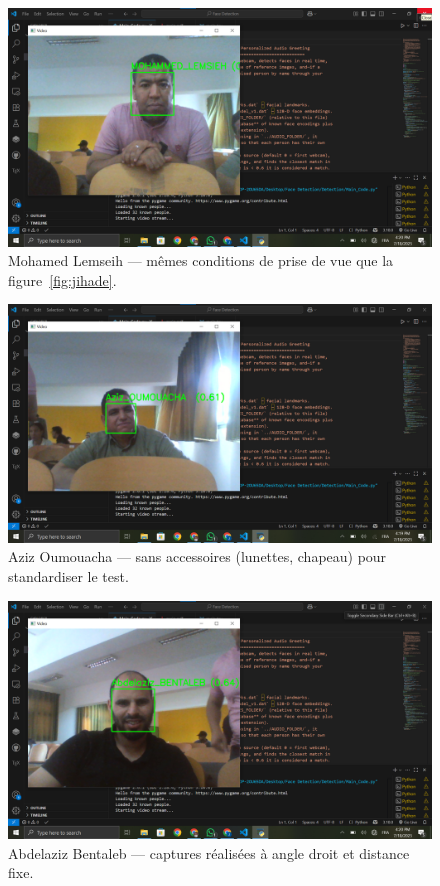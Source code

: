 \documentclass[12pt,a4paper]{article}
\begin{document}
\begin{figure}[H]
  \centering
  \includegraphics[width=\textwidth]{Mohamed_LEMSEIH.png}
  \caption{Mohamed Lemseih — mêmes conditions de prise de vue que la figure~\ref{fig:jihade}.}
  \label{fig:mohamed}
\end{figure}

\begin{figure}[H]
  \centering
  \includegraphics[width=\textwidth]{Aziz_OUMOUACHA.png}
  \caption{Aziz Oumouacha — sans accessoires (lunettes, chapeau) pour standardiser le test.}
  \label{fig:aziz}
\end{figure}

\begin{figure}[H]
  \centering
  \includegraphics[width=\textwidth]{Abdelaziz_BENTALEB.png}
  \caption{Abdelaziz Bentaleb — captures réalisées à angle droit et distance fixe.}
  \label{fig:abdelaziz}
\end{figure}
\end{document}
